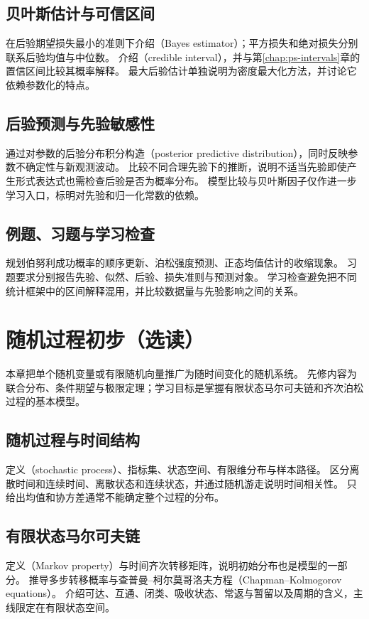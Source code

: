 \documentclass[UTF8,12pt,a4paper,fontset=fandol]{ctexbook}
\begin{document}
\section{贝叶斯估计与可信区间}
\label{sec:ps-bayesian-decisions}
在后验期望损失最小的准则下介绍（Bayes estimator）；平方损失和绝对损失分别联系后验均值与中位数。
介绍（credible interval），并与第\ref{chap:ps-intervals}章的置信区间比较其概率解释。
最大后验估计单独说明为密度最大化方法，并讨论它依赖参数化的特点。

\section{后验预测与先验敏感性}
\label{sec:ps-posterior-predictive}
通过对参数的后验分布积分构造（posterior predictive distribution），同时反映参数不确定性与新观测波动。
比较不同合理先验下的推断，说明不适当先验即使产生形式表达式也需检查后验是否为概率分布。
模型比较与贝叶斯因子仅作进一步学习入口，标明对先验和归一化常数的依赖。

\section{例题、习题与学习检查}
规划伯努利成功概率的顺序更新、泊松强度预测、正态均值估计的收缩现象。
习题要求分别报告先验、似然、后验、损失准则与预测对象。
学习检查避免把不同统计框架中的区间解释混用，并比较数据量与先验影响之间的关系。


\chapter{随机过程初步（选读）}
\label{chap:ps-processes}

本章把单个随机变量或有限随机向量推广为随时间变化的随机系统。
先修内容为联合分布、条件期望与极限定理；学习目标是掌握有限状态马尔可夫链和齐次泊松过程的基本模型。

\section{随机过程与时间结构}
\label{sec:ps-process-language}
定义（stochastic process）、指标集、状态空间、有限维分布与样本路径。
区分离散时间和连续时间、离散状态和连续状态，并通过随机游走说明时间相关性。
只给出均值和协方差通常不能确定整个过程的分布。

\section{有限状态马尔可夫链}
\label{sec:ps-markov-chains}
定义（Markov property）与时间齐次转移矩阵，说明初始分布也是模型的一部分。
推导多步转移概率与查普曼--柯尔莫哥洛夫方程（Chapman--Kolmogorov equations）。
介绍可达、互通、闭类、吸收状态、常返与暂留以及周期的含义，主线限定在有限状态空间。
\end{document}
